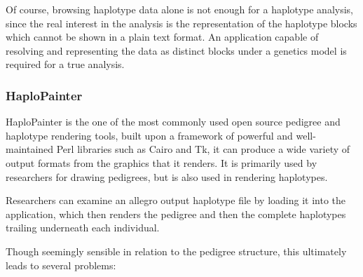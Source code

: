 Of course, browsing haplotype data alone is not enough for a haplotype analysis, since the real interest in the analysis is the representation of the haplotype blocks which cannot be shown in a plain text format. An application capable of resolving and representing the data as distinct blocks under a genetics model is required for a true analysis.


\subsubsection{HaploPainter}

HaploPainter is the one of the most commonly used open source pedigree and haplotype rendering tools, built upon a framework of powerful and well-maintained Perl libraries such as Cairo and \gls{Tk}, it can produce a wide variety of output formats from the graphics that it renders. 
It is primarily used by researchers for drawing pedigrees, but is also used in rendering haplotypes.

Researchers can examine an allegro output haplotype file by loading it into the application, which then renders the pedigree and then the complete haplotypes trailing underneath each individual.

Though seemingly sensible in relation to the pedigree structure, this ultimately leads to several problems:


